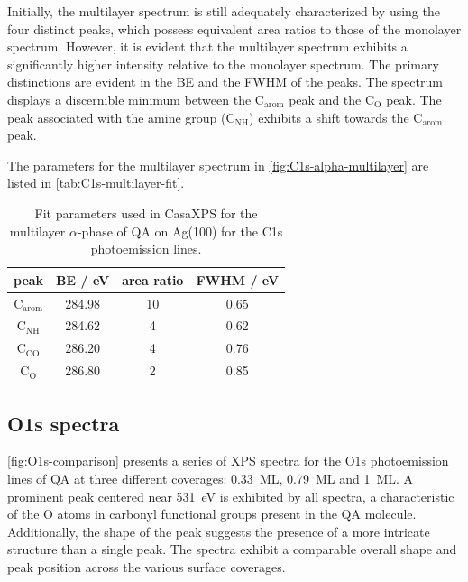 Initially, the multilayer spectrum is still adequately characterized by using the four distinct peaks, which possess equivalent area ratios to those of the monolayer spectrum. However, it is evident that the multilayer spectrum exhibits a significantly higher intensity relative to the monolayer spectrum. The primary distinctions are evident in the \ac{BE} and the \ac{FWHM} of the peaks. The spectrum displays a discernible minimum between the $\mathrm{C_{arom}}$ peak and the $\mathrm{C_{O}}$ peak. The peak associated with the amine group ($\mathrm{C_{NH}}$) exhibits a shift towards the $\mathrm{C_{arom}}$ peak.

The parameters for the multilayer spectrum in \autoref{fig:C1s-alpha-multilayer} are listed in \autoref{tab:C1s-multilayer-fit}.

\begin{table}[H]
	\centering
	\caption{Fit parameters used in CasaXPS\autocite{CasaSoftwareLtd2022} for the multilayer $\alpha$-phase of \ac{QA} on Ag(100) for the C1s photoemission lines.}
	\begin{tabular}{@{}cccc@{}} \toprule
		peak & \ac{BE} / eV & area ratio & FWHM / eV \\
		\midrule
		$\mathrm{C_{arom}}$ & 284.98 & 10 & 0.65 \\
		$\mathrm{C_{NH}}$ & 284.62 & 4 & 0.62 \\
		$\mathrm{C_{CO}}$ & 286.20 & 4 & 0.76 \\ 
		$\mathrm{C_{O}}$ & 286.80 & 2 & 0.85 \\
		\bottomrule
	\end{tabular}
	\label{tab:C1s-multilayer-fit}
\end{table}


\cleardoublepage
\subsection{O1s spectra}

\autoref{fig:O1s-comparison} presents a series of \ac{XPS} spectra for the O1s photoemission lines of \ac{QA} at three different coverages: 0.33~\ac{ML}, 0.79~\ac{ML} and 1~\ac{ML}. A prominent peak centered near 531~\si{\eV} is exhibited by all spectra, a characteristic of the O atoms in carbonyl functional groups present in the \ac{QA} molecule. Additionally, the shape of the peak suggests the presence of a more intricate structure than a single peak. The spectra exhibit a comparable overall shape and peak position across the various surface coverages.

